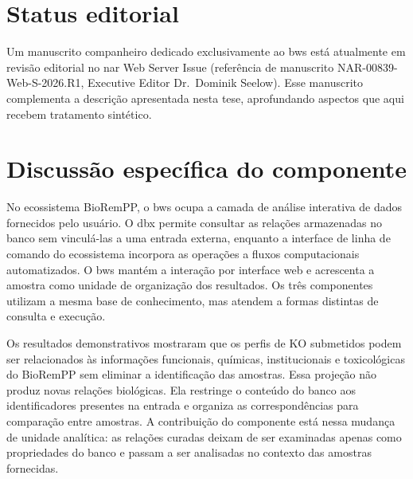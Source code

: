 \section{Status editorial}
\label{sec:c3-editorial}

Um manuscrito companheiro dedicado exclusivamente ao \gls{bws} está atualmente em revisão editorial no \gls{nar} Web Server Issue (referência de manuscrito NAR-00839-Web-S-2026.R1, Executive Editor Dr.~Dominik Seelow). Esse manuscrito complementa a descrição apresentada nesta tese, aprofundando aspectos que aqui recebem tratamento sintético.

\section{Discussão específica do componente}
\label{sec:c3-discussao}

No ecossistema BioRemPP, o \gls{bws} ocupa a camada de análise interativa de
dados fornecidos pelo usuário. O \gls{dbx} permite consultar as relações
armazenadas no banco sem vinculá-las a uma entrada externa, enquanto a
interface de linha de comando do ecossistema incorpora as operações a
fluxos computacionais automatizados. O \gls{bws} mantém a interação por
interface web e acrescenta a amostra como unidade de organização dos
resultados. Os três componentes utilizam a mesma base de conhecimento, mas
atendem a formas distintas de consulta e execução.

Os resultados demonstrativos mostraram que os perfis de KO submetidos podem
ser relacionados às informações funcionais, químicas, institucionais e
toxicológicas do BioRemPP sem eliminar a identificação das amostras. Essa
projeção não produz novas relações biológicas. Ela restringe o conteúdo do
banco aos identificadores presentes na entrada e organiza as correspondências
para comparação entre amostras. A contribuição do componente está nessa
mudança de unidade analítica: as relações curadas deixam de ser examinadas
apenas como propriedades do banco e passam a ser analisadas no contexto das
amostras fornecidas.

